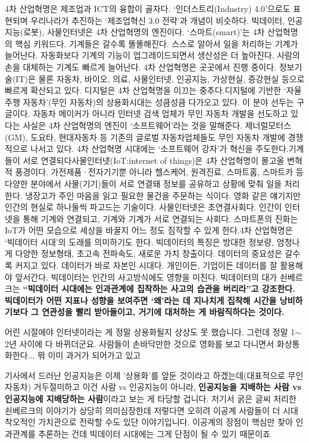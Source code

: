 4차 산업혁명은 제조업과 ICT의 융합이 골자다. ‘인더스트리(Industry) 4.0’으로도 표현되며 우리나라가 추진하는 ‘제조업혁신 3.0 전략’과 개념이 비슷하다. 빅데이터, 인공지능(로봇), 사물인터넷은 4차 산업혁명의 엔진이다. ‘스마트(smart)’는 4차 산업혁명의 핵심 키워드다. 기계들은 갈수록 똘똘해진다. 스스로 알아서 일을 처리하는 기계가 늘어난다. 자동화보다 기계의 기능이 업그레이드되면서 생산성은 더 높아진다. 사람의 손을 대체하는 기계도 빠르게 늘어난다. 4차 산업혁명은 곳곳에서 진행 중이다. 정보기술(IT)은 물론 자동차, 바이오, 의료, 사물인터넷, 인공지능, 가상현실, 증강현실 등으로 빠르게 확산되고 있다. 디지털은 4차 산업혁명을 이끄는 중추다.디지털에 기반한 ‘자율주행 자동차’(무인 자동차)의 상용화시대는 성큼성큼 다가오고 있다. 이 분야 선두는 구글이다. 자동차 메이커가 아니라 인터넷 검색 업체가 무인 자동차 개발을 선도하고 있다는 사실은 4차 산업혁명의 엔진이 ‘소프트웨어’라는 것을 말해준다. 제너럴모터스(GM), 도요타, 현대자동차 등 기존의 글로벌 자동차업체들도 무인 자동차 개발에 경쟁적으로 나서고 있다. 4차 산업혁명 시대에는 ‘소프트웨어 강자’가 혁신을 주도한다.기계들이 서로 연결되다사물인터넷(IoT:internet of things)은 4차 산업혁명이 몰고올 변혁적 풍경이다. 가전제품·전자기기뿐 아니라 헬스케어, 원격진료, 스마트홈, 스마트카 등 다양한 분야에서 사물(기기)들이 서로 연결돼 정보를 공유하고 상황에 맞춰 일을 처리한다. 냉장고가 주인 마음을 읽고 필요한 물건을 주문하는 식이다. 영화 같은 얘기지만 인간의 현실로 하나둘씩 파고드는 기술이다. 사물인터넷은 초연결사회다. 인간이 인터넷을 통해 기계와 연결되고, 기계와 기계가 서로 연결되는 사회다. 스마트폰의 진화는 IoT가 어떤 모습으로 세상을 바꿀지 어느 정도 짐작할 수 있게 한다.4차 산업혁명은 ‘빅데이터 시대’의 도래를 의미하기도 한다. 빅데이터의 특징은 방대한 정보량, 엄청나게 다양한 정보형태, 초고속 전파속도, 새로운 가치 창출이다. 데이터의 중요성은 갈수록 커지고 있다. 데이터가 바로 자본인 시대다. 개인이든, 기업이든 데이터를 잘 활용해야 앞서간다. 빅데이터는 인간의 사고방식에도 영향을 미친다. 빅데이터의 대가 쇤베르크는 \textbf{“빅데이터 시대에는 인과관계에 집착하는 사고의 습관을 버리라”고 강조한다. 빅데이터가 어떤 지표나 성향을 보여주면 ‘왜’라는 데 지나치게 집착해 시간을 낭비하기보다 그 연관성을 빨리 받아들이고, 거기에 대처하는 게 바람직하다는 것이다.}
\vspace{5mm}

어린 시절에야 인터넷이라는 게 정말 상용화될지 상상도 못 했습니다.
그런데 정말 1$\sim$2년 사이에 다 바뀌더군요.
사람들이 손바닥만한 것으로 영화를 보고 다니면서 화상통화한다... 뭐 이미 과거가 되어가고 있고
\vspace{5mm}

기사에서 드러난 인공지능은 이제 '상용화'를 앞둔 것이라고 하겠는데(대표적으로 무인자동차)
거두절미하고 이건 사람 vs 인공지능이 아니라, \textbf{인공지능을 지배하는 사람 vs 인공지능에 지배당하는 사람}이라고 보는 게 타당할 겁니다.
저기서 굵은 글씨 처리한 쇤베르크의 이야기가 상당히 의미심장한데
저렇다면 오히려 이공계 사람들이 더 시대착오적인 가치관으로 전락할 수도 있단 이야기입니다.
이공계의 장점이 핵심만 찾아 인과관계를 추론하는 건데 빅데이터 시대에는 그게 단점이 될 수 있기 때문이죠
\vspace{5mm}






